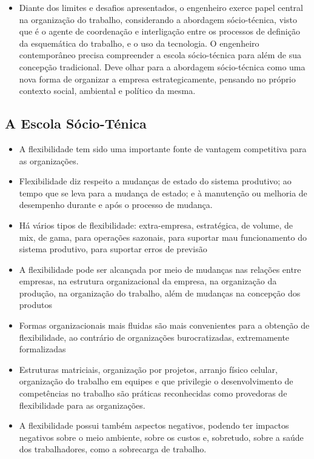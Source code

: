 \documentclass{article}
\begin{document}
\begin{itemize}
    \item Diante dos limites e desafios apresentados, o engenheiro exerce papel central na organização do trabalho, considerando a abordagem sócio-técnica, visto que é o agente de coordenação e interligação entre os processos de definição da esquemática do trabalho, e o uso da tecnologia. O engenheiro contemporâneo precisa compreender a escola sócio-técnica para além de sua concepção tradicional. Deve olhar para a abordagem sócio-técnica como uma nova forma de organizar a empresa estrategicamente, pensando no próprio contexto social, ambiental e político da mesma.    
\end{itemize}

\subsection{A Escola Sócio-Ténica}

\begin{itemize}
    \item A flexibilidade tem sido uma importante fonte de vantagem competitiva para as organizações.
    \item Flexibilidade diz respeito a mudanças de estado do sistema produtivo; ao tempo que se leva para a mudança de estado; e à manutenção ou melhoria de desempenho durante e após o processo de mudança.
    \item Há vários tipos de flexibilidade: extra-empresa, estratégica, de volume, de mix, de gama, para operações sazonais, para suportar mau funcionamento do sistema produtivo, para suportar erros de previsão
    \item A flexibilidade pode ser alcançada por meio de mudanças nas relações entre empresas, na estrutura organizacional da empresa, na organização da produção, na organização do trabalho, além de mudanças na concepção dos produtos
    \item Formas organizacionais mais fluidas são mais convenientes para a obtenção de flexibilidade, ao contrário de organizações burocratizadas, extremamente formalizadas
    \item Estruturas matriciais, organização por projetos, arranjo físico celular, organização do trabalho em equipes e que privilegie o desenvolvimento de competências no trabalho são práticas reconhecidas como provedoras de flexibilidade para as organizações.
    \item A flexibilidade possui também aspectos negativos, podendo ter impactos negativos sobre o meio ambiente, sobre os custos e, sobretudo, sobre a saúde dos trabalhadores, como a sobrecarga de trabalho.     
\end{itemize}
\end{document}
